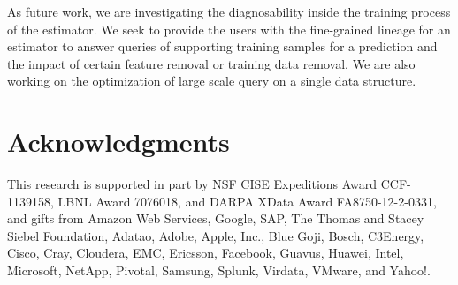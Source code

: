 \documentclass{sig-alternate}
\begin{document}
As future work, we are investigating the diagnosability inside the training process of the estimator. 
We seek to provide the users with the fine-grained lineage for an estimator to answer queries of 
supporting training samples for a prediction and the impact of certain feature removal or training data removal. 
We are also working on the optimization of large scale query on a single data structure.

\section{Acknowledgments}
This research is supported in part by NSF CISE Expeditions Award CCF-1139158, LBNL Award 7076018, and DARPA XData Award FA8750-12-2-0331, and gifts from Amazon Web Services, Google, SAP,  The Thomas and Stacey Siebel Foundation, Adatao, Adobe, Apple, Inc., Blue Goji, Bosch, C3Energy, Cisco, Cray, Cloudera, EMC, Ericsson, Facebook, Guavus, Huawei, Intel, Microsoft, NetApp, Pivotal, Samsung, Splunk, Virdata, VMware, and Yahoo!. 

%

%
%



\balancecolumns

\end{document}
